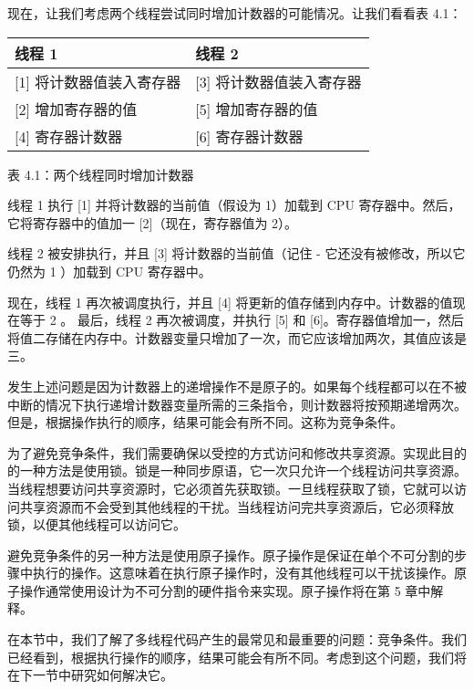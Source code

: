 现在，让我们考虑两个线程尝试同时增加计数器的可能情况。让我们看看表 4.1：

\begin{longtable}{|l|l|}
\hline
线程 1                          & 线程 2                          \\ \hline
\endfirsthead
%
\endhead
%
{[}1{]} 将计数器值装入寄存器 & {[}3{]} 将计数器值装入寄存器 \\ \hline
{[}2{]} 增加寄存器的值  & {[}5{]} 增加寄存器的值  \\ \hline
{[}4{]} 寄存器计数器 & {[}6{]} 寄存器计数器 \\ \hline
\end{longtable}

\begin{center}
表 4.1：两个线程同时增加计数器
\end{center}

线程 1 执行 [1] 并将计数器的当前值（假设为 1）加载到 CPU 寄存器中。然后，它将寄存器中的值加一 [2]（现在，寄存器值为 2）。

线程 2 被安排执行，并且 [3] 将计数器的当前值（记住 - 它还没有被修改，所以它仍然为 1 ）加载到 CPU 寄存器中。

现在，线程 1 再次被调度执行，并且 [4] 将更新的值存储到内存中。计数器的值现在等于 2 。
最后，线程 2 再次被调度，并执行 [5] 和 [6]。寄存器值增加一，然后将值二存储在内存中。计数器变量只增加了一次，而它应该增加两次，其值应该是三。

发生上述问题是因为计数器上的递增操作不是原子的。如果每个线程都可以在不被中断的情况下执行递增计数器变量所需的三条指令，则计数器将按预期递增两次。但是，根据操作执行的顺序，结果可能会有所不同。这称为竞争条件。

为了避免竞争条件，我们需要确保以受控的方式访问和修改共享资源。实现此目的的一种方法是使用锁。锁是一种同步原语，它一次只允许一个线程访问共享资源。当线程想要访问共享资源时，它必须首先获取锁。一旦线程获取了锁，它就可以访问共享资源而不会受到其他线程的干扰。当线程访问完共享资源后，它必须释放锁，以便其他线程可以访问它。

避免竞争条件的另一种方法是使用原子操作。原子操作是保证在单个不可分割的步骤中执行的操作。这意味着在执行原子操作时，没有其他线程可以干扰该操作。原子操作通常使用设计为不可分割的硬件指令来实现。原子操作将在第 5 章中解释。

在本节中，我们了解了多线程代码产生的最常见和最重要的问题：竞争条件。我们已经看到，根据执行操作的顺序，结果可能会有所不同。考虑到这个问题，我们将在下一节中研究如何解决它。





























